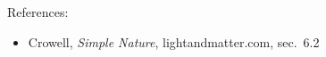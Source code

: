 References:
\begin{itemize}
\item Crowell, \emph{Simple Nature}, lightandmatter.com, sec.~6.2
\end{itemize}
